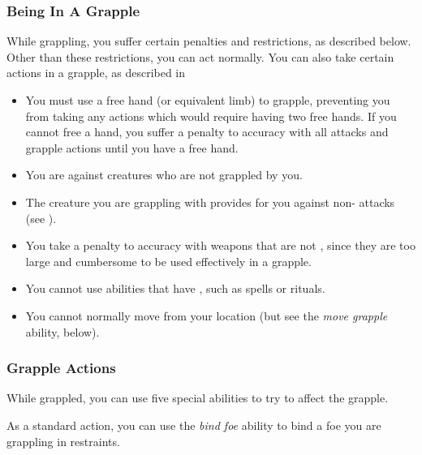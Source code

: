         \subsubsection{Being In A Grapple}
            While grappling, you suffer certain penalties and restrictions, as described below. Other than these restrictions, you can act normally. You can also take certain actions in a grapple, as described in 
            \begin{itemize}
                \item You must use a free hand (or equivalent limb) to grapple, preventing you from taking any actions which would require having two free hands.
                    If you cannot free a hand, you suffer a  penalty to accuracy with all  attacks and grapple actions until you have a free hand.
                \item You are  against creatures who are not grappled by you.
                \item The creature you are grappling with provides  for you against non- attacks (see ).
                \item You take a  penalty to accuracy with weapons that are not , since they are too large and cumbersome to be used effectively in a grapple.
                \item You cannot use abilities that have , such as spells or rituals.
                \item You cannot normally move from your location (but see the \textit{move grapple} ability, below).
            \end{itemize}

        \subsubsection{Grapple Actions}\label{Grapple Actions}
            While grappled, you can use five special abilities to try to affect the grapple.

             As a standard action, you can use the \textit{bind foe} ability to bind a foe you are grappling in restraints.

